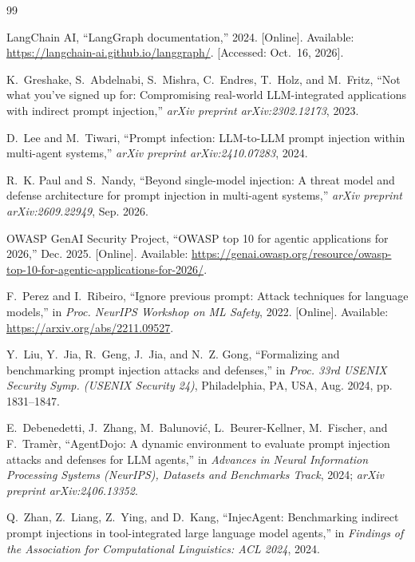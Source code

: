\documentclass[conference]{IEEEtran}
\begin{document}
\begin{thebibliography}{99}

{LangChain AI}, ``LangGraph documentation,'' 2024. [Online]. Available:
\url{https://langchain-ai.github.io/langgraph/}. [Accessed: Oct.~16, 2026].

K.~Greshake, S.~Abdelnabi, S.~Mishra, C.~Endres, T.~Holz, and M.~Fritz,
``Not what you've signed up for: Compromising real-world LLM-integrated
applications with indirect prompt injection,''
\emph{arXiv preprint arXiv:2302.12173}, 2023.

D.~Lee and M.~Tiwari,
``Prompt infection: LLM-to-LLM prompt injection within multi-agent systems,''
\emph{arXiv preprint arXiv:2410.07283}, 2024.

R.~K. Paul and S.~Nandy,
``Beyond single-model injection: A threat model and defense architecture for prompt
injection in multi-agent systems,''
\emph{arXiv preprint arXiv:2609.22949}, Sep. 2026.

{OWASP GenAI Security Project},
``OWASP top 10 for agentic applications for 2026,'' Dec. 2025. [Online].
Available: \url{https://genai.owasp.org/resource/owasp-top-10-for-agentic-applications-for-2026/}.

F.~Perez and I.~Ribeiro,
``Ignore previous prompt: Attack techniques for language models,''
in \emph{Proc. NeurIPS Workshop on ML Safety}, 2022.
[Online]. Available: \url{https://arxiv.org/abs/2211.09527}.

Y.~Liu, Y.~Jia, R.~Geng, J.~Jia, and N.~Z. Gong,
``Formalizing and benchmarking prompt injection attacks and defenses,''
in \emph{Proc. 33rd USENIX Security Symp. (USENIX Security 24)},
Philadelphia, PA, USA, Aug. 2024, pp. 1831--1847.

E.~Debenedetti, J.~Zhang, M.~Balunovi\'{c}, L.~Beurer-Kellner, M.~Fischer,
and F.~Tram\`{e}r,
``AgentDojo: A dynamic environment to evaluate prompt injection attacks and
defenses for LLM agents,''
in \emph{Advances in Neural Information Processing Systems (NeurIPS), Datasets and
Benchmarks Track}, 2024; \emph{arXiv preprint arXiv:2406.13352}.

Q.~Zhan, Z.~Liang, Z.~Ying, and D.~Kang,
``InjecAgent: Benchmarking indirect prompt injections in tool-integrated
large language model agents,''
in \emph{Findings of the Association for Computational Linguistics: ACL 2024},
2024.


\end{thebibliography}
\end{document}
